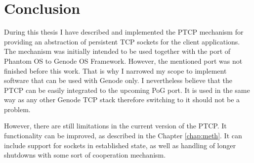 \chapter{Conclusion}
\label{chap:conc}

During this thesis I have described and implemented the PTCP mechanism for
providing an abstraction of persistent TCP sockets for the client applications.
The mechanism was initially intended to be used together with the port of
Phantom OS to Genode OS Framework. However, the mentioned port was not finished
before this work. That is why I narrowed my scope to implement software that
can be used with Genode only. I nevertheless believe that the PTCP can be
easily integrated to the upcoming PoG port. It is used in the same way as any
other Genode TCP stack therefore switching to it should not be a problem.

However, there are still limitations in the current version of the PTCP. It
functionality can be improved, as described in the Chapter \ref{chap:meth}. It
can include support for sockets in established state, as well as handling of
longer shutdowns with some sort of cooperation mechanism.
